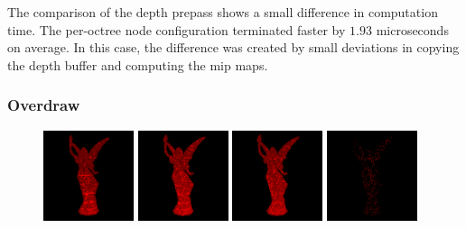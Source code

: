 \noindent
The comparison of the depth prepass shows a small difference in computation time. The per-octree node configuration 
terminated faster by $1.93$ microseconds on average. In this case, the difference was created by small deviations in 
copying the depth buffer and computing the mip maps. 

\subsubsection*{Overdraw}

\begin{figure}[!htb]
  \centering
  \includegraphics[height=100px]{images/graphics/overdraw-lucy1-nocull.png}
  \includegraphics[height=100px]{images/graphics/overdraw-lucy1-pooc.png}
  \includegraphics[height=100px]{images/graphics/overdraw-lucy1-pmoc.png}
  \includegraphics[height=100px]{images/graphics/overdraw-lucy1-diff.png}


\end{figure}
